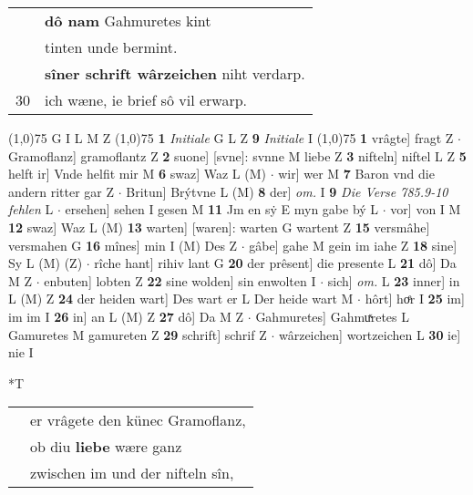\documentclass[8pt,a4paper,notitlepage]{article}
\begin{document}
\begin{table}[ht]
\begin{minipage}[t]{0.5\linewidth}
\begin{tabular}{rl}
 & \textbf{dô nam} Gahmuretes kint\\ 
 & tinten unde bermint.\\ 
 & \textbf{sîner schrift wârzeichen} niht verdarp.\\ 
30 & ich wæne, ie brief sô vil erwarp.\\ 
\end{tabular}
\scriptsize
\line(1,0){75} \newline
G I L M Z \newline
\line(1,0){75} \newline
\textbf{1} \textit{Initiale} G L Z  \textbf{9} \textit{Initiale} I  \newline
\line(1,0){75} \newline
\textbf{1} vrâgte] fragt Z  $\cdot$ Gramoflanz] gramoflantz Z \textbf{2} suone] [svne]: svnne M liebe Z \textbf{3} nifteln] niftel L Z \textbf{5} helft ir] Vnde helfit mir M \textbf{6} swaz] Waz L (M)  $\cdot$ wir] wer M \textbf{7} Baron vnd die andern ritter gar Z  $\cdot$ Britun] Brýtvne L (M) \textbf{8} der] \textit{om.} I \textbf{9} \textit{Die Verse 785.9-10 fehlen} L   $\cdot$ ersehen] sehen I gesen M \textbf{11} Jm en sẏ E myn gabe bý L  $\cdot$ vor] von I M \textbf{12} swaz] Waz L (M) \textbf{13} warten] [waren]: warten G wartent Z \textbf{15} versmâhe] versmahen G \textbf{16} mînes] min I (M) Des Z  $\cdot$ gâbe] gahe M gein im iahe Z \textbf{18} sine] Sy L (M) (Z)  $\cdot$ rîche hant] rihiv lant G \textbf{20} der prêsent] die presente L \textbf{21} dô] Da M Z  $\cdot$ enbuten] lobten Z \textbf{22} sine wolden] sin enwolten I  $\cdot$ sich] \textit{om.} L \textbf{23} inner] in L (M) Z \textbf{24} der heiden wart] Des wart er L Der heide wart M  $\cdot$ hôrt] hoͤr I \textbf{25} im] im im I \textbf{26} in] an L (M) Z \textbf{27} dô] Da M Z  $\cdot$ Gahmuretes] Gahmuͯretes L Gamuretes M gamureten Z \textbf{29} schrift] schrif Z  $\cdot$ wârzeichen] wortzeichen L \textbf{30} ie] nie I \newline
\end{minipage}
\hspace{0.5cm}
\begin{minipage}[t]{0.5\linewidth}
\small
\begin{center}*T
\end{center}
\begin{tabular}{rl}
 & er vrâgete den künec Gramoflanz,\\ 
 & ob diu \textbf{liebe} wære ganz\\ 
 & zwischen im und der nifteln sîn,\\ 

\end{tabular}
\end{minipage}
\end{table}
\end{document}
